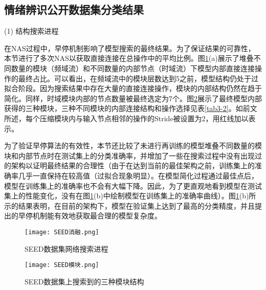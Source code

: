\subsection{情绪辨识公开数据集分类结果}

(1) 结构搜索进程

在NAS过程中，早停机制影响了模型搜索的最终结果。为了保证结果的可靠性，本节进行了多次NAS以获取直接连接在总操作中的平均比例。图\ref{fig3-3}(a)展示了堆叠不同数量的模块（频域流）和不同数量的内部节点（时域流）下模型内部直接连接操作的最终占比。可以看出，在频域流中的模块层数达到5之前，模型结构仍处于过拟合阶段。因为搜索结果中存在大量的直接连接操作，模块的内部结构仍然在趋于简化。同样，时域模块内部的节点数量被最终选定为7个。图\ref{fig3-4}展示了最终模型内部获得的三种模块，三种不同模块的内部连接结构和操作选择见表\ref{tab3-2}。如前文所述，每个压缩模块内与输入节点相邻的操作的Stride被设置为2，用红线加以表示。

为了验证早停算法的有效性，本节还比较了未进行再训练的模型堆叠不同数量的模块和内部节点时在测试集上的分类准确率，并增加了一些在搜索过程中没有出现过的架构以证明最终结果的合理性（由于在达到当前的最佳架构之前，训练集上的准确率几乎一直保持在较高值（过拟合现象明显）。在模型简化过程通过最佳点后，模型在训练集上的准确率也不会有大幅下降。因此，为了更直观地看到模型在测试集上的性能变化，没有在图\ref{fig3-3}(b)中绘制模型在训练集上的准确率曲线）。图\ref{fig3-3}(b)所示的结果表明，在目前的架构下，模型在验证集上达到了最高的分类精度，并且提出的早停机制能有效地获取最合理的模型复杂度。

\begin{figure}[!b]
	\centering
	\texttt{[image: SEED消融.png]}
	\caption{SEED数据集网络搜索进程} 
	\label{fig3-3}
\end{figure}


\begin{figure}[!b]
	\centering
	\texttt{[image: SEED模块.png]}
	\caption{SEED数据集上搜索到的三种模块结构} 
	\label{fig3-4}
\end{figure}


